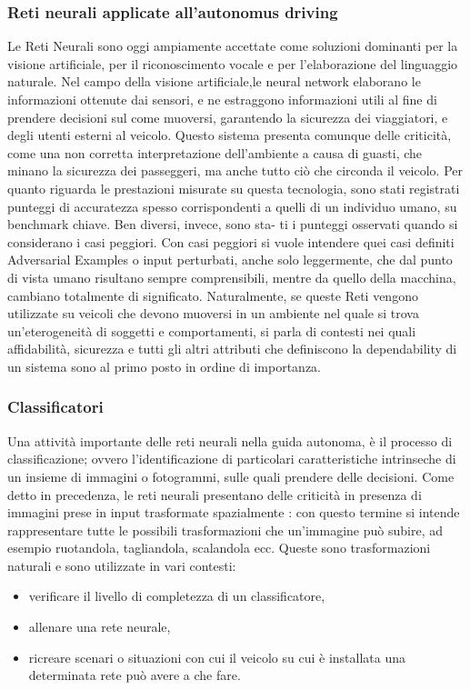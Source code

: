 \documentclass[14pt]{extarticle}
\begin{document}
\subsubsection{Reti neurali applicate all'autonomus driving}
Le Reti Neurali sono oggi ampiamente accettate come soluzioni dominanti per la visione artificiale, per il riconoscimento vocale e per l'elaborazione del linguaggio naturale. Nel campo della visione artificiale,le neural network elaborano le informazioni ottenute dai sensori, e ne estraggono informazioni utili al fine di prendere decisioni sul come muoversi, garantendo la sicurezza dei viaggiatori, e degli utenti esterni al veicolo. 
Questo sistema presenta comunque delle criticità, come una non corretta interpretazione dell'ambiente a causa di guasti, che minano la sicurezza dei passeggeri, ma anche tutto ciò che circonda il veicolo.%
Per quanto riguarda le prestazioni misurate su questa tecnologia, sono stati
registrati punteggi di accuratezza spesso corrispondenti a quelli di un
individuo umano, su benchmark chiave. Ben diversi, invece, sono sta-
ti i punteggi osservati quando si considerano i casi peggiori. Con casi
peggiori si vuole intendere quei casi definiti Adversarial Examples \cite{engstrom2019exploring} o
input perturbati, anche solo leggermente, che dal punto di vista umano
risultano sempre comprensibili, mentre da quello della macchina, cambiano totalmente di significato. Naturalmente, se queste Reti vengono
utilizzate su veicoli che devono muoversi in un ambiente nel quale si
trova un'eterogeneità di soggetti e comportamenti, si parla di contesti
nei quali affidabilità, sicurezza e tutti gli altri attributi che definiscono la
dependability di un sistema sono al primo posto in ordine di importanza.

\subsubsection{Classificatori}
Una attività importante delle reti neurali nella guida autonoma, è il processo di classificazione; ovvero l'identificazione di particolari caratteristiche  intrinseche di un insieme di immagini o fotogrammi, sulle quali prendere delle decisioni.
Come detto in precedenza, le reti neurali presentano delle criticità in presenza di immagini prese in input trasformate spazialmente \cite{engstrom2019exploring}: con
questo termine si intende rappresentare tutte le possibili trasformazioni
che un'immagine può subire, ad esempio ruotandola, tagliandola, scalandola ecc. Queste sono trasformazioni naturali e sono utilizzate in vari
contesti:
\begin{itemize}
\item verificare il livello di completezza di un classificatore,
\item allenare una rete neurale,
\item ricreare scenari o situazioni con cui il veicolo su cui è installata una
determinata rete può avere a che fare.
\end{itemize}
\end{document}
